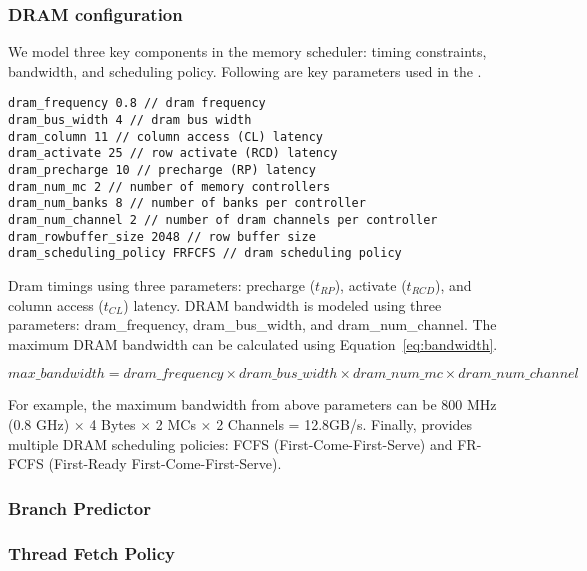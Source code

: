 \subsubsection{DRAM configuration}
\label{sec:param-dram}

We model three key components in the memory scheduler: timing
constraints, bandwidth, and scheduling policy. Following are key
parameters used in the \SIM.


\smallskip
\begin{lstlisting}
dram_frequency 0.8 // dram frequency
dram_bus_width 4 // dram bus width
dram_column 11 // column access (CL) latency
dram_activate 25 // row activate (RCD) latency
dram_precharge 10 // precharge (RP) latency
dram_num_mc 2 // number of memory controllers
dram_num_banks 8 // number of banks per controller
dram_num_channel 2 // number of dram channels per controller
dram_rowbuffer_size 2048 // row buffer size
dram_scheduling_policy FRFCFS // dram scheduling policy
\end{lstlisting}
\smallskip

Dram timings using three parameters: precharge ($t_{RP}$), activate
($t_{RCD}$), and column access ($t_{CL}$) latency. DRAM bandwidth is
modeled using three
parameters: \textsf{dram\_frequency}, \textsf{dram\_bus\_width},
and \textsf{dram\_num\_channel}. The maximum DRAM bandwidth can be
calculated using Equation~\ref{eq:bandwidth}.

\begin{equation}
\label{eq:bandwidth}
max\_bandwidth = dram\_frequency \times dram\_bus\_width \times dram\_num\_mc \times dram\_num\_channel 
\end{equation}

For example, the maximum bandwidth from above parameters can
be \textsf{800 MHz (0.8 GHz)} $\times$ \textsf{4 Bytes}
$\times$ \textsf{2 MCs} $\times$ \textsf{2 Channels}
= \textsf{12.8GB/s}. Finally, \SIM provides multiple DRAM scheduling
policies: FCFS (First-Come-First-Serve) and FR-FCFS (First-Ready
First-Come-First-Serve).


\subsubsection{Branch Predictor}



\subsubsection{Thread Fetch Policy}

